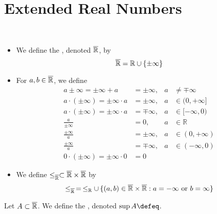 \documentclass{book}
\begin{document}
	
	
	
	
	
	
	
	
	
	
	
	
	
	
	
	
	
	
	
	\section{Extended Real Numbers}
	
	
	\begin{defn}\
		\begin{itemize}
			\item We define the , denoted $\overline{\mathbb{R}}$, by 
			$$ \overline{\mathbb{R}} = \mathbb{R} \cup \{\pm \infty\}$$
			\item For $a,b \in \overline{\mathbb{R}}$, we define
			\begin{align*}
				a \pm \infty = \pm\infty + a & = \pm\infty, & a & \neq \mp\infty \\
				a \cdot (\pm\infty) = \pm\infty \cdot a & = \pm\infty, & a & \in (0, +\infty] \\
				a \cdot (\pm\infty) = \pm\infty \cdot a & = \mp\infty, & a & \in [-\infty, 0) \\
				\frac{a}{\pm\infty} & = 0, & a & \in \mathbb{R} \\
				\frac{\pm\infty}{a} & = \pm\infty, & a & \in (0, +\infty) \\
				\frac{\pm\infty}{a} & = \mp\infty, & a & \in (-\infty, 0) \\
				0 \cdot (\pm\infty) = \pm\infty \cdot 0 & = 0
			\end{align*}
			\item We define $\leq_{\overline{\mathbb{R}}} \subset \overline{\mathbb{R}} \times \overline{\mathbb{R}}$ by 
			$$\leq_{\overline{\mathbb{R}}} \, = \, \leq_{\mathbb{R}} \cup \, \{(a,b) \in \overline{\mathbb{R}} \times \overline{\mathbb{R}}: a = - \infty \text{ or } b = \infty\}$$
		\end{itemize}
	\end{defn}
	
	\begin{defn}
		Let $A \subset \overline{\mathbb{R}}$. We define the , denoted $\sup A \defeq$.
	\end{defn}
	
\end{document}
